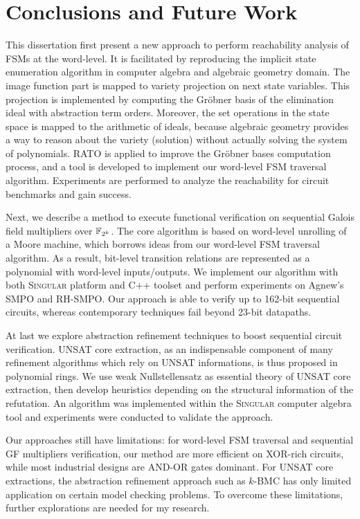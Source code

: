 \chapter{Conclusions and Future Work}
\label{ch:conclude}
This dissertation first present a new approach to perform reachability
analysis of FSMs at the word-level. It is facilitated by reproducing 
the implicit state enumeration algorithm in computer algebra and algebraic
geometry domain. The image function part is mapped to variety projection on 
next state variables. This projection is implemented by computing the 
Gr\"obner basis of the elimination ideal with abstraction term orders.
Moreover, the set operations in the state space is mapped to 
the arithmetic of ideals, because algebraic geometry provides a 
way to reason about the variety (solution) without actually solving the 
system of polynomials. RATO is applied to improve the Gr\"obner bases 
computation process, and a tool is developed to implement our 
word-level FSM traversal algorithm. Experiments are performed to 
analyze the reachability for circuit benchmarks and gain success.

Next, we describe a method to execute functional verification on sequential Galois field
multipliers over ${\mathbb{F}}_{2^k}$.  The core algorithm is based on word-level unrolling of 
a Moore machine, which borrows ideas from our word-level FSM traversal 
algorithm. As a result, bit-level transition relations are represented 
as a polynomial with word-level inputs/outputs.
We implement our algorithm with both \textsc{Singular} platform and C++ toolset 
and perform experiments on Agnew's SMPO and RH-SMPO.
Our approach is able to verify up to 162-bit sequential
circuits, whereas contemporary techniques fail beyond 23-bit
datapaths.  

At last we explore abstraction refinement techniques to boost sequential circuit verification.
UNSAT core extraction, as an indispensable component of many refinement algorithms 
which rely on UNSAT informations, is thus proposed in polynomial rings.
We use weak Nullstellensatz as essential theory of UNSAT core extraction, 
then develop heuristics depending on the structural information of the refutation.
An algorithm was implemented within the \textsc{Singular} computer algebra tool
and experiments were conducted to validate the approach.

Our approaches still have limitations: for word-level FSM traversal and 
sequential GF multipliers verification, our method are more efficient
on XOR-rich circuits, while most industrial designs are AND-OR gates dominant.
For UNSAT core extractions, the abstraction refinement approach such as $k$-BMC 
has only limited application on certain model checking problems. To overcome these limitations,
further explorations are needed for my research. 
  
